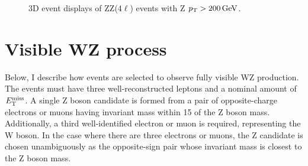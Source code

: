 \clearpage
\begin{figure}[!htb]
\centering
\setlength{\fboxsep}{0pt}
\setlength{\fboxrule}{0.3pt}
\vspace{1cm}

\vspace{1cm}

\caption{3D event displays of ZZ($4\ell$) events with Z $p_\mathrm{T} > 200 \,\text{Ge\hspace{-.08em}V}$. 
\eventDisplayCaption
\label{fig:zz4l_eventdisplay}}
\end{figure}
\clearpage


\section{Visible WZ process}
\label{sec:wz3l}
Below, I describe how events are selected to observe fully visible WZ production. 
The events must have three well-reconstructed leptons and a nominal amount of $E_\mathrm{T}^{\mathrm{miss}}$.
A single Z boson candidate is formed from a pair of opposite-charge electrons or muons having invariant mass within 15 \GeV of the Z boson mass.
Additionally, a third well-identified electron or muon is required, representing the W boson.
In the case where there are three electrons or muons,
the Z candidate is chosen unambiguously as the opposite-sign pair whose invariant mass is closest to the Z boson mass.

